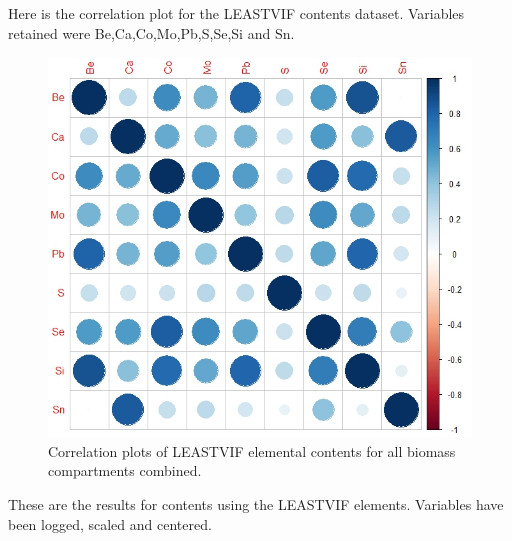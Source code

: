 \documentclass[
]{article}
\begin{document}
\FloatBarrier

\newpage

Here is the correlation plot for the LEASTVIF contents dataset.
Variables retained were Be,Ca,Co,Mo,Pb,S,Se,Si and Sn.

\begin{figure}
\includegraphics[width=1\linewidth]{Figures/CORRPLOT_1_LEAST_VIF} \caption[Correlation plots of LEASTVIF elemental contents for all biomass compartments combined]{Correlation plots of LEASTVIF elemental contents for all biomass compartments combined.}\label{fig:unnamed-chunk-10}
\end{figure}

\FloatBarrier

These are the results for contents using the LEASTVIF elements.
Variables have been logged, scaled and centered.

\newpage
\end{document}
